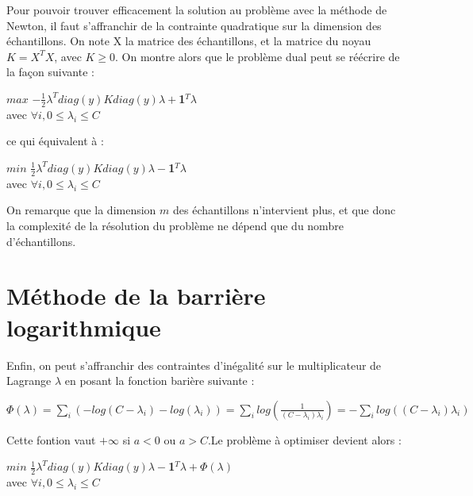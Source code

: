 \documentclass{article}
\begin{document}
Pour pouvoir trouver efficacement la solution au problème avec la méthode de Newton, il faut s'affranchir de la contrainte quadratique sur la dimension des échantillons. On note X la matrice des échantillons, et la matrice du noyau $K = X^TX$, avec $K \geq 0$. On montre alors que le problème dual peut se réécrire de la façon suivante :\\

                 \begin{center}
                 $max$ $-\frac{1}{2}\lambda^Tdiag(y)Kdiag(y)\lambda+$\textbf{1}$^T\lambda$\\
                 avec $\forall i, 0 \leq \lambda_i \leq C$ 
                 \end{center}

ce qui équivalent à :\\

            \begin{center}
                 $min$ $\frac{1}{2}\lambda^Tdiag(y)Kdiag(y)\lambda-$\textbf{1}$^T\lambda$\\
                 avec $\forall i, 0 \leq \lambda_i \leq C$ 
                 \end{center}

On remarque que la dimension $m$ des échantillons n'intervient plus, et que donc la complexité de la résolution du problème ne dépend que du nombre d'échantillons. 

\section{Méthode de la barrière logarithmique}

Enfin, on peut s'affranchir des contraintes d'inégalité sur le multiplicateur de Lagrange $\lambda$ en posant la fonction barière suivante :\\

          \begin{center}
          $\Phi(\lambda) = \sum_i (- log(C - \lambda_i) - log(\lambda_i)) = \sum_i log(\frac{1}{(C - \lambda_i)\lambda_i}) = - \sum_i log((C - \lambda_i)\lambda_i)$ 
          \end{center}

Cette fontion vaut $+\infty$ si $a<0$ ou $a>C$.Le problème à optimiser devient alors :\\

          \begin{center}
                 $min$ $\frac{1}{2}\lambda^Tdiag(y)Kdiag(y)\lambda-$\textbf{1}$^T\lambda +\Phi(\lambda)$\\
                 avec $\forall i, 0 \leq \lambda_i \leq C$ 
                 \end{center}
\end{document}
